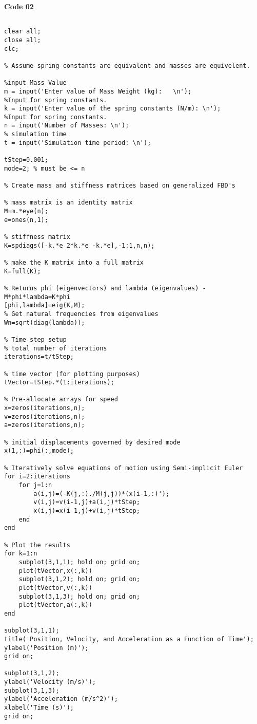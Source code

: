 \newpage

\textbf{\Large Code 02}\\






\begin{framed}
\begin{verbatim}

clear all; 
close all;
clc;

% Assume spring constants are equivalent and masses are equivelent.

%input Mass Value
m = input('Enter value of Mass Weight (kg):   \n');
%Input for spring constants.
k = input('Enter value of the spring constants (N/m): \n');
%Input for spring constants.
n = input('Number of Masses: \n');
% simulation time
t = input('Simulation time period: \n');

tStep=0.001;
mode=2; % must be <= n

% Create mass and stiffness matrices based on generalized FBD's

% mass matrix is an identity matrix
M=m.*eye(n); 
e=ones(n,1);

% stiffness matrix
K=spdiags([-k.*e 2*k.*e -k.*e],-1:1,n,n);

% make the K matrix into a full matrix
K=full(K); 

% Returns phi (eigenvectors) and lambda (eigenvalues) - M*phi*lambda=K*phi
[phi,lambda]=eig(K,M);
% Get natural frequencies from eigenvalues
Wn=sqrt(diag(lambda)); 

% Time step setup
% total number of iterations
iterations=t/tStep;

% time vector (for plotting purposes)
tVector=tStep.*(1:iterations); 

% Pre-allocate arrays for speed
x=zeros(iterations,n);
v=zeros(iterations,n);
a=zeros(iterations,n);

% initial displacements governed by desired mode
x(1,:)=phi(:,mode); 

% Iteratively solve equations of motion using Semi-implicit Euler
for i=2:iterations
    for j=1:n
        a(i,j)=(-K(j,:)./M(j,j))*(x(i-1,:)');
        v(i,j)=v(i-1,j)+a(i,j)*tStep;
        x(i,j)=x(i-1,j)+v(i,j)*tStep;
    end
end

% Plot the results
for k=1:n
    subplot(3,1,1); hold on; grid on;
    plot(tVector,x(:,k))
    subplot(3,1,2); hold on; grid on;
    plot(tVector,v(:,k))
    subplot(3,1,3); hold on; grid on;
    plot(tVector,a(:,k))
end

subplot(3,1,1);
title('Position, Velocity, and Acceleration as a Function of Time');
ylabel('Position (m)');
grid on;

subplot(3,1,2);
ylabel('Velocity (m/s)');
subplot(3,1,3);
ylabel('Acceleration (m/s^2)');
xlabel('Time (s)');
grid on;



\end{verbatim}
\end{framed}


